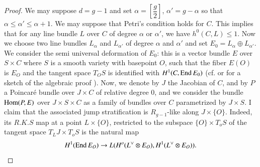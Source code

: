 \begin{proof}
We may suppose $d=g-1$ and set $\alpha=\left[\dfrac{g}{2}\right]$,
$\alpha'=g-\alpha$ so that $\alpha\leq \alpha'\leq \alpha+1$. We may
suppose that Petri's condition holds for $C$. This implies that for
any line bundle $L$ over $C$ of degree $\alpha$ or $\alpha'$, we have
$h^{0}(C,L)\leq 1$. Now we choose two line bundles $L_{\alpha}$ and
$L_{\alpha'}$ of degree $\alpha$ and $\alpha'$ and set
$E_{0}=L_{\alpha}\oplus L_{\alpha'}$. We consider the semi universal
deformation of $E_{0}$: this is a vector bundle $E$ over $S\times C$
where $S$ is a smooth variety with base\pageoriginale point $O$, such
that the fiber $E(O)$ is $E_{O}$ and the tangent space $T_{O}S$ is
identified with $H^{1}(C,\operatorname{End} E_{0})$ (cf. \cite{chap6-KS} or for a
sketch of the algebraic proof \cite{chap6-Bi}). Now, we denote by $J$
the Jacobian of $C$, and by $P$ a Poincar\'e bundle over $J\times C$
of relative degree $0$, and we consider the bundle $\operatorname{Hom}(P,E)$ over
$J\times S\times C$ as a family of bundles over $C$ parametrized by
$J\times S$. I claim that the associated jump stratification is
$R_{g-1}$-like along $J\times \{O\}$. Indeed, its $R.K.S$ map at a
point $L\times \{O\}$, restricted to the subspace $\{O\}\times T_{o}S$
of the tangent space $T_{L}J\times T_{o}S$ is the natural map
$$
H^{1}(\End E_{O})\to L(H^{o}(L\spcheck \otimes E_{O}),
H^{1}(L\spcheck \otimes E_{O})). 
$$


\end{proof}
